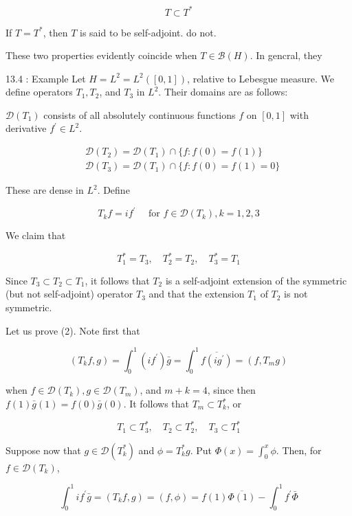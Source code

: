 \documentclass[10pt]{article}
\begin{document}
$$
T \subset T^{*}
$$

If $T=T^{*}$, then $T$ is said to be self-adjoint. do not.

These two properties evidently coincide when $T \in \mathscr{B}(H)$. In gencral, they

13.4 : Example Let $H=L^{2}=L^{2}([0,1])$, relative to Lebesgue measure. We define operators $T_{1}, T_{2}$, and $T_{3}$ in $L^{2}$. Their domains are as follows:

$\mathscr{D}\left(T_{1}\right)$ consists of all absolutely continuous functions $f$ on $[0,1]$ with derivative $f^{\prime} \in L^{2}$.

$$
\begin{aligned}
& \mathscr{D}\left(T_{2}\right)=\mathscr{D}\left(T_{1}\right) \cap\{f: f(0)=f(1)\} \\
& \mathscr{D}\left(T_{3}\right)=\mathscr{D}\left(T_{1}\right) \cap\{f: f(0)=f(1)=0\}
\end{aligned}
$$

These are dense in $L^{2}$. Define

$$
T_{k} f=i f^{\prime} \quad \text { for } f \in \mathscr{D}\left(T_{k}\right), k=1,2,3
$$

We claim that

$$
T_{1}^{*}=T_{3}, \quad T_{2}^{*}=T_{2}, \quad T_{3}^{*}=T_{1}
$$

Since $T_{3} \subset T_{2} \subset T_{1}$, it follows that $T_{2}$ is a self-adjoint extension of the symmetric (but not self-adjoint) operator $T_{3}$ and that the extension $T_{1}$ of $T_{2}$ is not symmetric.

Let us prove (2). Note first that

$$
\left(T_{k} f, g\right)=\int_{0}^{1}\left(i f^{\prime}\right) \bar{g}=\int_{0}^{1} \overline{f\left(i g^{\prime}\right)}=\left(f, T_{m} g\right)
$$

when $f \in \mathscr{D}\left(T_{k}\right), g \in \mathscr{D}\left(T_{m}\right)$, and $m+k=4$, since then $f(1) \bar{g}(1)=f(0) \bar{g}(0)$. It follows that $T_{m} \subset T_{k}^{*}$, or

$$
T_{1} \subset T_{3}^{*}, \quad T_{2} \subset T_{2}^{*}, \quad T_{3} \subset T_{1}^{*}
$$

Suppose now that $g \in \mathscr{D}\left(T_{k}^{*}\right)$ and $\phi=T_{k}^{*} g$. Put $\Phi(x)=\int_{0}^{x} \phi$. Then, for $f \in \mathscr{D}\left(T_{k}\right)$,

$$
\int_{0}^{1} i f^{\prime} \bar{g}=\left(T_{k} f, g\right)=(f, \phi)=f(1) \overline{\Phi(1)}-\int_{0}^{1} f^{\prime} \bar{\Phi}
$$
\end{document}
